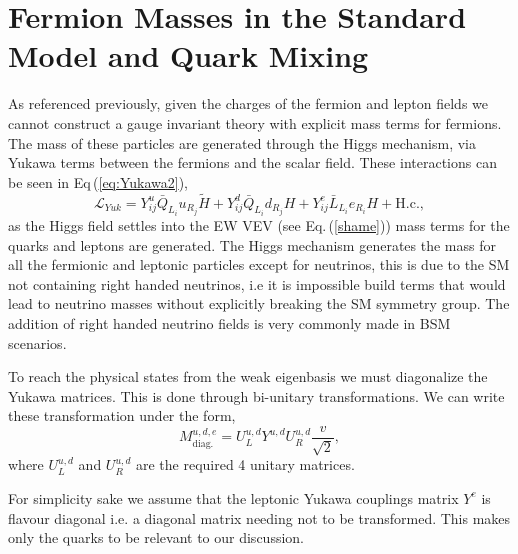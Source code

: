 \documentclass[10pt]{book}
\renewcommand{\(}{\left(}
\renewcommand{\)}{\right)}
\renewcommand{\[}{\left[}
\renewcommand{\]}{\right]}
\begin{document}
\section{Fermion Masses in the Standard Model and Quark Mixing}
\label{Chap_1_Sec_3}

As referenced previously, given the charges of the fermion and lepton fields we cannot construct a gauge invariant theory with explicit mass terms for fermions. 
%
The mass of these particles are generated through the Higgs mechanism, via Yukawa terms between the fermions and the scalar field. 
%
These interactions can be seen in Eq\,(\ref{eq:Yukawa2}), 
%
\begin{equation} 
\label{eq:Yukawa2}
\mathcal{L}_{Yuk} = Y^u_{ij} \bar{Q}_{L_i} u_{R_j}  \tilde{H} + Y^d_{ij} \bar{Q}_{L_i}  d_{R_j} H  + Y^e_{ij} \bar{L}_{L_i}  e_{R_i} H + \text{H.c.} , 
\end{equation} 
%
as the Higgs field settles into the EW VEV (see Eq.\,(\ref{shame})) mass terms for the quarks and leptons are generated. 
%
The Higgs mechanism generates the mass for all the fermionic and leptonic particles except for neutrinos, this is due to the SM not containing right handed neutrinos, i.e it is impossible build terms that would lead to neutrino masses without explicitly breaking the SM symmetry group.
% 
The addition of right handed neutrino fields is very commonly made in BSM scenarios. 

To reach the physical states from the weak eigenbasis we must diagonalize the Yukawa matrices. This is done through bi-unitary transformations. 
% 
We can write these transformation under the form,
%
\begin{equation}
\label{YukawaMasses} 
M^{u,d,e}_{\text{diag.}}= U^{u,d}_L Y^{u,d} U^{u,d}_R \frac{v}{\sqrt{2}} , 
\end{equation} 
%
where $U^{u,d}_L$ and $U^{u,d}_R$ are the required 4 unitary matrices. 

%
%
For simplicity sake we assume that the leptonic Yukawa couplings matrix $Y^{e}$ is flavour diagonal i.e. a diagonal matrix needing not to be transformed. This makes only the quarks to be relevant to our discussion.  
\end{document}
